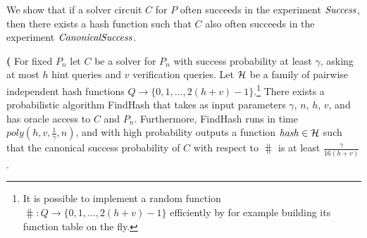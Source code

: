 We show that if a solver circuit $C$ for $P$ often succeeds in the experiment $\operatorname{\mathit{Success}}$,
then there exists a hash function such that $C$ also often succeeds in the experiment $\operatorname{\mathit{CanonicalSuccess}}$.
%
%
\begin{lemma}\textbf{(}
\label{lemma:hash_function_probability}
For fixed $P_n$ let $C$ be a solver for $P_n$ with success probability at least $\gamma$,
asking at most $h$ hint queries and $v$ verification queries.
Let $\mathcal{H}$ be a family of pairwise independent hash functions $Q \rightarrow \{0,1, \dots,2(h+v)-1\}$.\footnote{It
is possible to implement a random function $\hash: Q \rightarrow \{0,1,\dotsc, 2(h+v)-1\}$ efficiently by for example building its function table on the fly.}
There exists a probabilistic algorithm FindHash that takes as input
parameters $\gamma$, $n$, $h$, $v$, and has oracle access to $C$ and $P_n$.
Furthermore, FindHash runs in time $\mathit{poly}(h,v,\frac{1}{\gamma},n)$,
and with high probability outputs a function $\operatorname{\mathit{hash}} \in \mathcal{H}$
such that the canonical success probability of $C$ with respect to $\hash$ is at least $\frac{\gamma}{16(h+v)}$.
\end{lemma}
%
